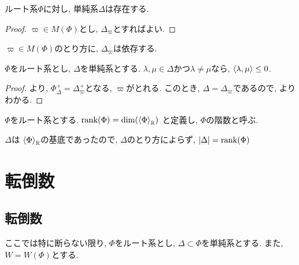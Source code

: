 \begin{cor}
  ルート系$\Phi$に対し, 単純系$\Delta$は存在する.
\end{cor}
\begin{proof}
  $\varpi\in M(\Phi)$とし, $\Delta_\varpi$とすればよい.
\end{proof}
\begin{remark}
  $\varpi\in M(\Phi)$のとり方に, $\Delta_\varpi$は依存する.
\end{remark}

\begin{theorem}
  $\Phi$をルート系とし,
  $\Delta$を単純系とする.
  $\lambda,\mu\in\Delta$かつ$\lambda\neq \mu$なら, $\Braket{\lambda,\mu}\leq 0$.
  
\end{theorem}
\begin{proof}
  より,
  $\Phi_\Delta^+=\Delta_\varpi^+$となる, $\varpi$がとれる.
  このとき, $\Delta=\Delta_\varpi$であるので,
  よりわかる.
\end{proof}



\begin{definition}
  $\Phi$をルート系とする.
  $\operatorname{rank}(\Phi)=\dim(\Braket{\Phi}_{\mathbb{R}})$
  と定義し, $\Phi$の階数と呼ぶ.
\end{definition}

\begin{remark}
  $\Delta$は
  $\Braket{\Phi}_{\mathbb{R}}$の基底であったので,
  $\Delta$のとり方によらず,
  $\left|\Delta\right|=\operatorname{rank}(\Phi)$
\end{remark}


\chapter{転倒数}
\section{転倒数}
ここでは特に断らない限り,
$\Phi$をルート系とし, $\Delta\subset\Phi$を単純系とする.
また, $W=W(\Phi)$とする.


